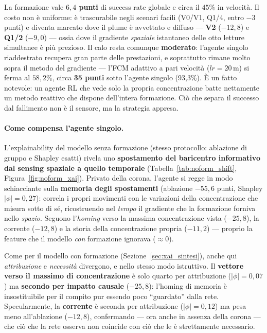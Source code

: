 La formazione vale \textbf{$6{,}4$ punti} di success rate globale e circa il $45\%$ in
velocit\`a. Il costo non \`e uniforme: \`e trascurabile negli scenari facili (V0/V1, Q1/4,
entro $-3$ punti) e diventa marcato dove il plume \`e avvettato e diffuso --- \textbf{V2}
($-12{,}8$) e \textbf{Q1/2} ($-9{,}0$) --- ossia dove il gradiente \emph{spaziale}
istantaneo delle otto letture simultanee \`e pi\`u prezioso. Il calo resta comunque
\textbf{moderato}: l'agente singolo riaddestrato recupera gran parte delle prestazioni, e
soprattutto rimane molto sopra il metodo del gradiente --- l'FCM adattivo a pari velocit\`a
($lr=20\,$m) si ferma al $58{,}2\%$, circa \textbf{35 punti} sotto l'agente singolo (93{,}3\%).
\`E un fatto notevole: un agente RL che vede solo la propria concentrazione batte nettamente
un metodo reattivo che dispone dell'intera formazione. Ci\`o che separa il successo dal
fallimento non \`e il sensore, ma la strategia appresa.

\paragraph{Come compensa l'agente singolo.} L'explainability del modello senza formazione
(stesso protocollo: ablazione di gruppo e Shapley esatti) rivela uno \textbf{spostamento del
baricentro informativo dal sensing spaziale a quello temporale}
(Tabella~\ref{tab:noform_shift}, Figura~\ref{fig:noform_xai}). Privato della corona,
l'agente si regge in modo schiacciante sulla \textbf{memoria degli spostamenti} (ablazione
$-55{,}6$ punti, Shapley $|\phi|=0{,}27$): correla i propri movimenti con le variazioni
della concentrazione che misura sotto di s\'e, ricostruendo nel \emph{tempo} il gradiente
che la formazione forniva nello \emph{spazio}. Seguono l'\emph{homing} verso la massima
concentrazione vista ($-25{,}8$), la corrente ($-12{,}8$) e la storia della concentrazione
propria ($-11{,}2$) --- proprio la feature che il modello \emph{con} formazione ignorava
($\approx 0$).

Come per il modello con formazione (Sezione~\ref{sec:xai_sintesi}), anche qui
\emph{attribuzione} e \emph{necessit\`a} divergono, e nello stesso modo istruttivo. Il
\textbf{vettore verso il massimo di concentrazione} \`e solo quarto per attribuzione
($|\phi| = 0{,}07$) ma \textbf{secondo per impatto causale} ($-25{,}8$): l'homing di memoria
\`e insostituibile per il compito pur essendo poco ``guardato'' dalla rete. Specularmente, la
\textbf{corrente} \`e seconda per attribuzione ($|\phi| = 0{,}12$) ma pesa meno all'ablazione
($-12{,}8$), confermando --- ora anche in assenza della corona --- che ci\`o che la rete
osserva non coincide con ci\`o che le \`e strettamente necessario.

